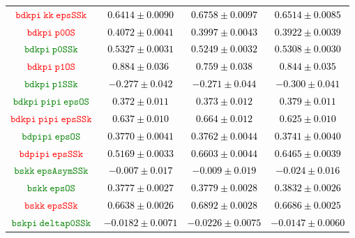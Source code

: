 \documentclass[10pt,a4paper]{article}
\begin{document}
\begin{table}[h!]
{\begin{tabular}{cccc}
\textcolor{red}{$\mathtt{bdkpi~kk~epsSSk~}$} & \textcolor{black}{$0.6414 \pm 0.0090$}& \textcolor{black}{$0.6758 \pm 0.0097$}& \textcolor{black}{$0.6514 \pm 0.0085$}\\
\textcolor{red}{$\mathtt{bdkpi~p0OS~}$} & \textcolor{black}{$0.4072 \pm 0.0041$}& \textcolor{black}{$0.3997 \pm 0.0043$}& \textcolor{black}{$0.3922 \pm 0.0039$}\\
\textcolor{Green}{$\mathtt{bdkpi~p0SSk~}$} & \textcolor{black}{$0.5327 \pm 0.0031$}& \textcolor{black}{$0.5249 \pm 0.0032$}& \textcolor{black}{$0.5308 \pm 0.0030$}\\
\textcolor{red}{$\mathtt{bdkpi~p1OS~}$} & \textcolor{black}{$0.884 \pm 0.036$}& \textcolor{black}{$0.759 \pm 0.038$}& \textcolor{black}{$0.844 \pm 0.035$}\\
\textcolor{Green}{$\mathtt{bdkpi~p1SSk~}$} & \textcolor{black}{$-0.277 \pm 0.042$}& \textcolor{black}{$-0.271 \pm 0.044$}& \textcolor{black}{$-0.300 \pm 0.041$}\\
\textcolor{Green}{$\mathtt{bdkpi~pipi~epsOS~}$} & \textcolor{black}{$0.372 \pm 0.011$}& \textcolor{black}{$0.373 \pm 0.012$}& \textcolor{black}{$0.379 \pm 0.011$}\\
\textcolor{red}{$\mathtt{bdkpi~pipi~epsSSk~}$} & \textcolor{black}{$0.637 \pm 0.010$}& \textcolor{black}{$0.664 \pm 0.012$}& \textcolor{black}{$0.625 \pm 0.010$}\\
\textcolor{Green}{$\mathtt{bdpipi~epsOS~}$} & \textcolor{black}{$0.3770 \pm 0.0041$}& \textcolor{black}{$0.3762 \pm 0.0044$}& \textcolor{black}{$0.3741 \pm 0.0040$}\\
\textcolor{red}{$\mathtt{bdpipi~epsSSk~}$} & \textcolor{black}{$0.5169 \pm 0.0033$}& \textcolor{black}{$0.6603 \pm 0.0044$}& \textcolor{black}{$0.6465 \pm 0.0039$}\\
\textcolor{Green}{$\mathtt{bskk~epsAsymSSk~}$} & \textcolor{black}{$-0.007 \pm 0.017$}& \textcolor{black}{$-0.009 \pm 0.019$}& \textcolor{black}{$-0.024 \pm 0.016$}\\
\textcolor{Green}{$\mathtt{bskk~epsOS~}$} & \textcolor{black}{$0.3777 \pm 0.0027$}& \textcolor{black}{$0.3779 \pm 0.0028$}& \textcolor{black}{$0.3832 \pm 0.0026$}\\
\textcolor{red}{$\mathtt{bskk~epsSSk~}$} & \textcolor{black}{$0.6638 \pm 0.0026$}& \textcolor{black}{$0.6892 \pm 0.0028$}& \textcolor{black}{$0.6686 \pm 0.0025$}\\
\textcolor{Green}{$\mathtt{bskpi~deltap0SSk~}$} & \textcolor{black}{$-0.0182 \pm 0.0071$}& \textcolor{black}{$-0.0226 \pm 0.0075$}& \textcolor{black}{$-0.0147 \pm 0.0060$}\\

\end{tabular}}
\end{table}
\end{document}
